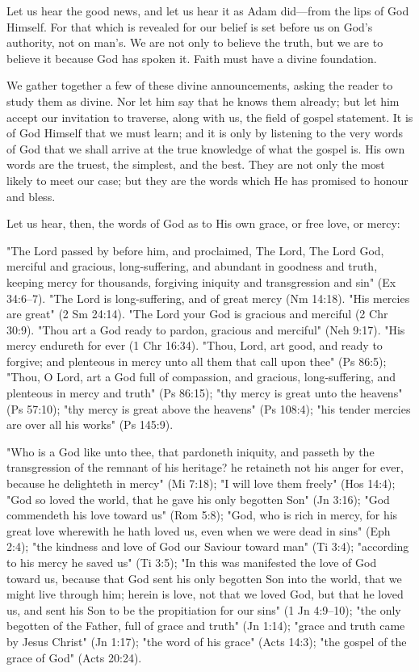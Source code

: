\documentclass[
]{book}
\begin{document}
Let us hear the good news, and let us hear it as Adam did---from the lips of God Himself. For that which is revealed for our belief is set before us on God's authority, not on man's. We are not only to believe the truth, but we are to believe it because God has spoken it. Faith must have a divine foundation.

We gather together a few of these divine announcements, asking the reader to study them as divine. Nor let him say that he knows them already; but let him accept our invitation to traverse, along with us, the field of gospel statement. It is of God Himself that we must learn; and it is only by listening to the very words of God that we shall arrive at the true knowledge of what the gospel is. His own words are the truest, the simplest, and the best. They are not only the most likely to meet our case; but they are the words which He has promised to honour and bless.

Let us hear, then, the words of God as to His own grace, or free love, or mercy:

"The Lord passed by before him, and proclaimed, The Lord, The Lord God, merciful and gracious, long-suffering, and abundant in goodness and truth, keeping mercy for thousands, forgiving iniquity and transgression and sin" (Ex 34:6--7). "The Lord is long-suffering, and of great mercy (Nm 14:18). "His mercies are great" (2 Sm 24:14). "The Lord your God is gracious and merciful (2 Chr 30:9). "Thou art a God ready to pardon, gracious and merciful" (Neh 9:17). "His mercy endureth for ever (1 Chr 16:34). "Thou, Lord, art good, and ready to forgive; and plenteous in mercy unto all them that call upon thee" (Ps 86:5); "Thou, O Lord, art a God full of compassion, and gracious, long-suffering, and plenteous in mercy and truth" (Ps 86:15); "thy mercy is great unto the heavens" (Ps 57:10); "thy mercy is great above the heavens" (Ps 108:4); "his tender mercies are over all his works" (Ps 145:9).

"Who is a God like unto thee, that pardoneth iniquity, and passeth by the transgression of the remnant of his heritage? he retaineth not his anger for ever, because he delighteth in mercy" (Mi 7:18); "I will love them freely" (Hos 14:4); "God so loved the world, that he gave his only begotten Son" (Jn 3:16); "God commendeth his love toward us" (Rom 5:8); "God, who is rich in mercy, for his great love wherewith he hath loved us, even when we were dead in sins" (Eph 2:4); "the kindness and love of God our Saviour toward man" (Ti 3:4); "according to his mercy he saved us" (Ti 3:5); "In this was manifested the love of God toward us, because that God sent his only begotten Son into the world, that we might live through him; herein is love, not that we loved God, but that he loved us, and sent his Son to be the propitiation for our sins" (1 Jn 4:9--10); "the only begotten of the Father, full of grace and truth" (Jn 1:14); "grace and truth came by Jesus Christ" (Jn 1:17); "the word of his grace" (Acts 14:3); "the gospel of the grace of God" (Acts 20:24).
\end{document}
